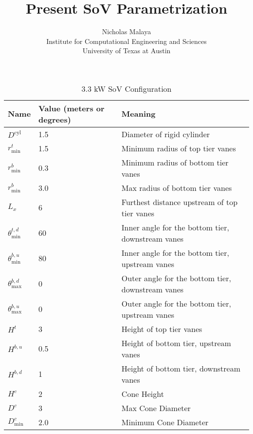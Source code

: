 \documentclass{article}
\title{\bf{Present SoV Parametrization}}
\author{Nicholas Malaya \\ Institute for Computational Engineering and
Sciences \\ University of Texas at Austin} \date{}
\begin{document}

\begin{table}[]
\centering
\begin{tabular}{lll}
Name                        & Value (meters or degrees) & Meaning                    \\
 \hline
$D^{\text{cyl}}$            &  1.5  & Diameter of rigid cylinder \\
$r^t_{\text{min}}$          &  1.5  & Minimum radius of top tier vanes \\
$r^b_{\text{min}}$          &  0.3  & Minimum radius of bottom tier vanes \\
$r^b_{\text{min}}$          &  3.0  & Max radius of bottom tier vanes \\
       $L_x$                &   6   & Furthest distance upstream of top	 tier vanes \\
$\theta_{\text{min}}^{t,d}$ &  60   & Inner angle for the bottom tier, downstream vanes \\
$\theta_{\text{min}}^{b,u}$ &  80   & Inner angle for the bottom tier, upstream vanes \\
$\theta_{\text{max}}^{b,d}$ &   0   & Outer angle for the bottom  tier, downstream vanes \\
$\theta_{\text{max}}^{b,u}$ &   0   & Outer angle for the bottom tier, upstream vanes \\
 $H^t    $                  &   3   & Height of top tier vanes \\
 $H^{b,u}$                  &  0.5  & Height of bottom tier, upstream vanes \\
 $H^{b,d}$                  &   1   & Height of bottom tier, downstream vanes \\
 $H^{c}$                    &   2   & Cone Height \\
 $D^{c}$                    &   3   & Max Cone Diameter \\
 $D_\text{min}^{c}$         &  2.0  & Minimum Cone Diameter \\
\end{tabular}
\label{my-label}
\caption{3.3 kW SoV Configuration}
\end{table}
\end{document}
